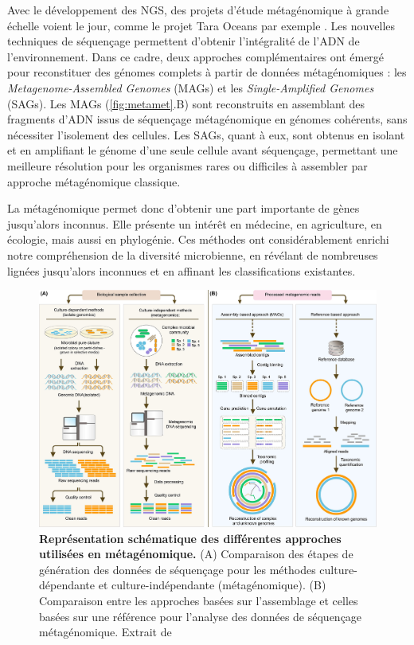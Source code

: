 Avec le développement des NGS, des projets d'étude métagénomique à grande échelle voient le jour, comme le projet Tara Oceans par exemple \cite{karsenti_holistic_2011}. Les nouvelles techniques de séquençage permettent d'obtenir l'intégralité de l'ADN de l'environnement. Dans ce cadre, deux approches complémentaires ont émergé pour reconstituer des génomes complets à partir de données métagénomiques : les \textit{Metagenome-Assembled Genomes} (MAGs) et les \textit{Single-Amplified Genomes} (SAGs). Les MAGs (\autoref{fig:metamet}.B) sont reconstruits en assemblant des fragments d’ADN issus de séquençage métagénomique en génomes cohérents, sans nécessiter l’isolement des cellules. Les SAGs, quant à eux, sont obtenus en isolant et en amplifiant le génome d’une seule cellule avant séquençage, permettant une meilleure résolution pour les organismes rares ou difficiles à assembler par approche métagénomique classique.

La métagénomique permet donc d'obtenir une part importante de gènes jusqu'alors inconnus. Elle présente un intérêt en médecine, en agriculture, en écologie, mais aussi en phylogénie. Ces méthodes ont considérablement enrichi notre compréhension de la diversité microbienne, en révélant de nombreuses lignées jusqu’alors inconnues et en affinant les classifications existantes.

\begin{figure}[htbp]
    \centering
    \includegraphics[width=.9\textwidth]{images/metagenomic.png}
    \caption[Représentation schématique des différentes approches utilisées en métagénomique]{\textbf{Représentation schématique des différentes approches utilisées en métagénomique.} (A) Comparaison des étapes de génération des données de séquençage pour les méthodes culture-dépendante et culture-indépendante (métagénomique). (B) Comparaison entre les approches basées sur l’assemblage et celles basées sur une référence pour l’analyse des données de séquençage métagénomique. Extrait de \cite{yang_review_2021}}
    \label{fig:metamet}
\end{figure}


